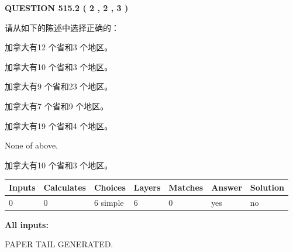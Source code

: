 \documentclass{ctexart}
\begin{document}
   
  
\vspace{0.2in}
  
{\textbf{\Large{QUESTION
515.2 
 ( 2 , 2 , 3 )
}}}
  
  
请从如下的陈述中选择正确的：
 
 
加拿大有12 个省和3 个地区。
 
 
加拿大有10 个省和3 个地区。
 
 
加拿大有9 个省和23 个地区。
 
 
加拿大有7 个省和9 个地区。
 
 
加拿大有19 个省和4 个地区。
 
 
 None of above.
 
 
\noindent{}
 
 
加拿大有10 个省和3 个地区。
 
 
\noindent{}
 
 
   
   
   
   
\noindent\begin{tabular}{|l|l|l|l|l|l|l|}
 \hline
Inputs & Calculates & Choices & Layers & Matches & Answer & Solution \\ \hline
 0  & 
 0  & 
 6
  simple  
  & 
 6  & 
 0  & 
  yes & 
  no 
  \\ \hline
 \end{tabular}
   
   
   
   
\noindent{}
   
   
   
   
\noindent\vspace{0.1in}\hspace{-0.08in} {\textbf{\Large{All inputs: }}}
   
   
   
   
   
   
 \vspace{0.2in}
 
   
   
\vspace{2.0in} PAPER TAIL GENERATED.
   
\end{document}
